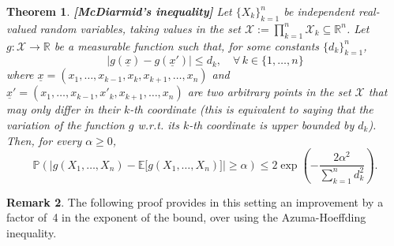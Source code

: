 \documentclass[12pt, oneside, a4paper]{article}
\theoremstyle{plain}
\newtheorem{thm}{Theorem}[section]
\theoremstyle{definition}
\newtheorem{rem}[thm]{Remark}
\def\deq{:=}
\def\reals{\mathbb{R}}
\def\pr{\ensuremath{\mathbb{P}}}
\def\expectation{\ensuremath{\mathbb{E}}}
\begin{document}
\begin{thm}{\bf[McDiarmid's inequality]}
Let $\{X_k\}_{k=1}^n$ be independent real-valued random variables,
taking values in the set
$\mathcal{X} \deq \prod_{k=1}^n \mathcal{X}_k \subseteq \reals^n$.
Let $g: \mathcal{X} \rightarrow \reals$ be a measurable function
such that, for some constants $\{d_k\}_{k=1}^n$,
\begin{equation}
\bigl| g(\underline{x}) - g(\underline{x}') \bigr| \leq d_k,
\quad \forall \, k \in \{1, \ldots, n\}
\label{eq: assumption on the variation of g}
\end{equation}
where $\underline{x} = (x_1, \ldots, x_{k-1}, x_k, x_{k+1}, \ldots, x_n)$
and $\underline{x}' = (x_1, \ldots, x_{k-1}, x'_k, x_{k+1}, \ldots, x_n)$
are two arbitrary points in the set $\mathcal{X}$ that may only differ in their
$k$-th coordinate (this is equivalent to saying that the variation of the
function $g$ w.r.t. its $k$-th coordinate is upper bounded by $d_k$).
Then, for every $\alpha \geq 0$,
\begin{equation}
\pr( \bigl| g(X_1, \ldots, X_n) - \expectation \bigl[g(X_1, \ldots, X_n) \bigr] \bigr|
\geq \alpha) \leq 2 \exp \left(-\frac{2 \alpha^2}{\sum_{k=1}^n d_k^2} \right).
\label{eq: McDiarmid's inequality}
\end{equation}
\label{theorem: McDiarmid's inequality}
\end{thm}

\begin{rem}
The following
proof provides in this setting an improvement by a factor of~4 in the exponent
of the bound, over using the Azuma-Hoeffding inequality. 
\end{rem}
\end{document}
